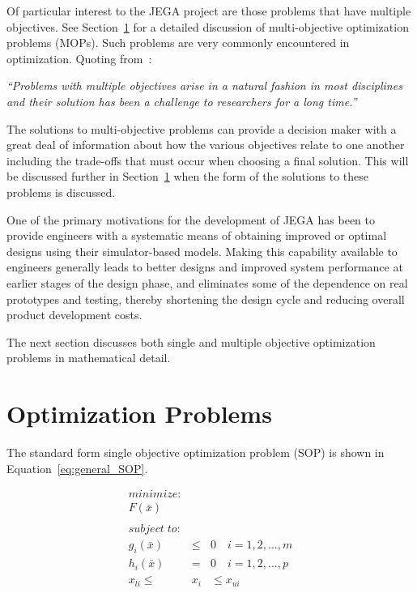 Of particular interest to the JEGA project are those problems that
have multiple objectives.  See Section~\ref{sec:general_MOP} for a
detailed discussion of multi-objective optimization problems (MOPs).
Such problems are very commonly encountered in optimization. Quoting
from~\cite{coello:eas_for_mop:2002}:

\begin{center}
\parbox{5in}{ \emph{``Problems with multiple objectives arise in a
natural fashion in most disciplines and their solution has been a
challenge to researchers for a long time.''} }
\end{center}

The solutions to multi-objective problems can provide a decision
maker with a great deal of information about how the various
objectives relate to one another including the trade-offs that must
occur when choosing a final solution.  This will be discussed
further in Section~\ref{sec:general_MOP} when the form of the
solutions to these problems is discussed.

\textcolor[rgb]{1.00,0.00,0.00}{ One of the primary motivations for
the development of JEGA has been to provide engineers with a
systematic means of obtaining improved or optimal designs using
their simulator-based models. Making this capability available to
engineers generally leads to better designs and improved system
performance at earlier stages of the design phase, and eliminates
some of the dependence on real prototypes and testing, thereby
shortening the design cycle and reducing overall product development
costs.}

The next section discusses both single and multiple objective
optimization problems in mathematical detail.

\section{Optimization Problems} \label{sec:general_MOP}
The standard form single objective optimization problem (SOP) is
shown in Equation~\ref{eq:general_SOP}.

\begin{eqnarray} \label{eq:general_SOP}
\nonumber minimize: & & \\
\nonumber F(\bar{x}) \\
\nonumber & & \\
\nonumber subject\; to: & & \\
          g_i(\bar{x}) &\leq & 0\quad i=1,2,...,m \\
\nonumber h_i(\bar{x}) &=& 0\quad i=1,2,...,p \\
\nonumber x_{li} \leq & x_i & \leq x_{ui}
\end{eqnarray}

